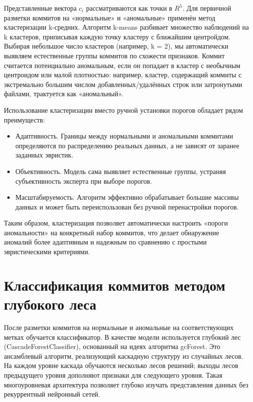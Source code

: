 Представленные вектора \( c_i \) рассматриваются как точки в \( R^5 \). Для первичной разметки коммитов на «нормальные» и «аномальные» применён метод кластеризации k-средних. Алгоритм k-means разбивает множество наблюдений на k кластеров, приписывая каждую точку кластеру с ближайшим центройдом. Выбирая небольшое число кластеров (например, k = 2), мы автоматически выявляем естественные группы коммитов по схожести признаков. Коммит считается потенциально аномальным, если он попадает в кластер с необычным центроидом или малой плотностью: например, кластер, содержащий коммиты с экстремально большим числом добавленных/удалённых строк или затронутыми файлами, трактуется как «аномальный».

Использование кластеризации вместо ручной установки порогов обладает рядом преимуществ:
\begin{itemize}
	\item Адаптивность. Границы между нормальными и аномальными коммитами определяются по распределению реальных данных, а не зависят от заранее заданных эвристик.
	\item Объективность. Модель сама выявляет естественные группы, устраняя субъективность эксперта при выборе порогов.
	\item Масштабируемость. Алгоритм эффективно обрабатывает большие массивы данных и может быть переиспользован без ручной перенастройки порогов.
\end{itemize}

Таким образом, кластеризация позволяет автоматически настроить «пороги аномальности» на конкретный набор коммитов, что делает обнаружение аномалий более адаптивным и надежным по сравнению с простыми эвристическими критериями.

\section{Классификация коммитов методом глубокого леса} \label{ch2:algorithm_selection}

После разметки коммитов на нормальные и аномальные на соответствующих метках обучается классификатор. В качестве модели используется глубокий лес (CascadeForestClassifier), основанный на идеях алгоритма gcForest. Это ансамблевый алгоритм, реализующий каскадную структуру из случайных лесов. На каждом уровне каскада обучаются несколько лесов решений; выходы лесов предыдущего уровня дополняют признаки для следующего уровня. Такая многоуровневая архитектура позволяет глубоко изучать представления данных без рекуррентный нейронный сетей.

